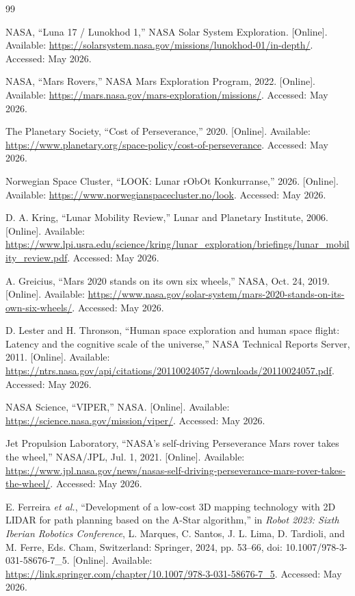 \cleardoublepage
{}

\begin{thebibliography}{99}

NASA, ``Luna 17 / Lunokhod 1,'' NASA Solar System Exploration. [Online]. Available: \url{https://solarsystem.nasa.gov/missions/lunokhod-01/in-depth/}. Accessed: May 2026.

NASA, ``Mars Rovers,'' NASA Mars Exploration Program, 2022. [Online]. Available: \url{https://mars.nasa.gov/mars-exploration/missions/}. Accessed: May 2026.

The Planetary Society, ``Cost of Perseverance,'' 2020. [Online]. Available: \url{https://www.planetary.org/space-policy/cost-of-perseverance}. Accessed: May 2026.

Norwegian Space Cluster, ``LOOK: Lunar rObOt Konkurranse,'' 2026. [Online]. Available: \url{https://www.norwegianspacecluster.no/look}. Accessed: May 2026.

D. A. Kring, ``Lunar Mobility Review,'' Lunar and Planetary Institute, 2006. [Online]. Available: \url{https://www.lpi.usra.edu/science/kring/lunar_exploration/briefings/lunar_mobility_review.pdf}. Accessed: May 2026.

A. Greicius, ``Mars 2020 stands on its own six wheels,'' NASA, Oct. 24, 2019. [Online]. Available: \url{https://www.nasa.gov/solar-system/mars-2020-stands-on-its-own-six-wheels/}. Accessed: May 2026.

D. Lester and H. Thronson, ``Human space exploration and human space flight: Latency and the cognitive scale of the universe,'' NASA Technical Reports Server, 2011. [Online]. Available: \url{https://ntrs.nasa.gov/api/citations/20110024057/downloads/20110024057.pdf}. Accessed: May 2026.

NASA Science, ``VIPER,'' NASA. [Online]. Available: \url{https://science.nasa.gov/mission/viper/}. Accessed: May 2026.

Jet Propulsion Laboratory, ``NASA's self-driving Perseverance Mars rover takes the wheel,'' NASA/JPL, Jul. 1, 2021. [Online]. Available: \url{https://www.jpl.nasa.gov/news/nasas-self-driving-perseverance-mars-rover-takes-the-wheel/}. Accessed: May 2026.

E. Ferreira \textit{et al.}, ``Development of a low-cost 3D mapping technology with 2D LIDAR for path planning based on the A-Star algorithm,'' in \textit{Robot 2023: Sixth Iberian Robotics Conference}, L. Marques, C. Santos, J. L. Lima, D. Tardioli, and M. Ferre, Eds. Cham, Switzerland: Springer, 2024, pp. 53--66, doi: 10.1007/978-3-031-58676-7\_5. [Online]. Available: \url{https://link.springer.com/chapter/10.1007/978-3-031-58676-7_5}. Accessed: May 2026.


\end{thebibliography}
